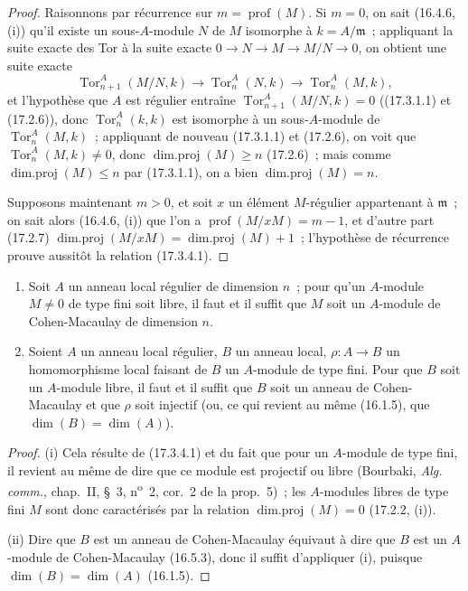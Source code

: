 \begin{proof}
Raisonnons par récurrence sur $m=\operatorname{prof}(M)$. Si $m=0$, on sait
(16.4.6, (i)) qu'il existe un sous-$A$-module $N$ de $M$ isomorphe à
$k=A/\mathfrak{m}$~; appliquant la suite exacte des Tor à la suite exacte
$0\longrightarrow N\longrightarrow M\longrightarrow M/N\longrightarrow0$,
on obtient une suite exacte
\[
  \operatorname{Tor}^A_{n+1}(M/N,k)\longrightarrow
  \operatorname{Tor}^A_n(N,k)\longrightarrow
  \operatorname{Tor}^A_n(M,k),
\]
et l'hypothèse que $A$ est régulier entraîne
$\operatorname{Tor}^A_{n+1}(M/N,k)=0$ ((17.3.1.1) et (17.2.6)), donc
$\operatorname{Tor}^A_n(k,k)$ est isomorphe à un sous-$A$-module de
$\operatorname{Tor}^A_n(M,k)$~; appliquant de nouveau (17.3.1.1) et (17.2.6),
on voit que $\operatorname{Tor}^A_n(M,k)\neq0$, donc
$\operatorname{dim.proj}(M)\geq n$ (17.2.6)~; mais comme
$\operatorname{dim.proj}(M)\leq n$ par (17.3.1.1), on a bien
$\operatorname{dim.proj}(M)=n$.

Supposons maintenant $m>0$, et soit $x$ un élément $M$-régulier appartenant à
$\mathfrak{m}$~; on sait alors (16.4.6, (i)) que l'on a
$\operatorname{prof}(M/xM)=m-1$, et d'autre part (17.2.7)
$\operatorname{dim.proj}(M/xM)=\operatorname{dim.proj}(M)+1$~; l'hypothèse de
récurrence prouve aussitôt la relation (17.3.4.1).
\end{proof}


\begin{corollary}[17.3.5]
\label{0.17.3.5-fr}
\begin{enumerate}
  \item[\rm(i)] Soit $A$ un anneau local régulier de dimension $n$~; pour
  qu'un $A$-module $M\neq0$ de type fini soit libre, il faut et il suffit que
  $M$ soit un $A$-module de Cohen-Macaulay de dimension $n$.
  \item[\rm(ii)] Soient $A$ un anneau local régulier, $B$ un anneau local,
  $\rho:A\to B$ un homomorphisme local faisant de $B$ un $A$-module de type
  fini. Pour que $B$ soit un $A$-module libre, il faut et il suffit que $B$
  soit un anneau de Cohen-Macaulay et que $\rho$ soit injectif (ou, ce qui
  revient au même (16.1.5), que $\dim(B)=\dim(A)$).
\end{enumerate}
\end{corollary}

\begin{proof}
(i) Cela résulte de (17.3.4.1) et du fait que pour un $A$-module de type fini,
il revient au même de dire que ce module est projectif ou libre (Bourbaki,
\emph{Alg. comm.}, chap.~II, \S~3, n\textsuperscript{o}~2, cor.~2 de la
prop.~5)~; les $A$-modules libres de type fini $M$ sont donc caractérisés par
la relation $\operatorname{dim.proj}(M)=0$ (17.2.2, (i)).

(ii) Dire que $B$ est un anneau de Cohen-Macaulay équivaut à dire que $B$ est
un $A$-module de Cohen-Macaulay (16.5.3), donc il suffit d'appliquer (i),
puisque $\dim(B)=\dim(A)$ (16.1.5).
\end{proof}

